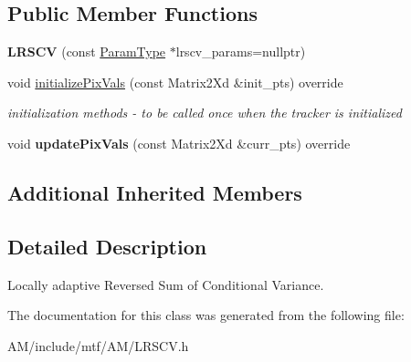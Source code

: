 \subsection*{Public Member Functions}
\begin{DoxyCompactItemize}
\item 
\hypertarget{classLRSCV_a8d86b6034bb0d83b09ae9a5c7b6ca465}{{\bfseries L\-R\-S\-C\-V} (const \hyperlink{structLRSCVParams}{Param\-Type} $\ast$lrscv\-\_\-params=nullptr)}\label{classLRSCV_a8d86b6034bb0d83b09ae9a5c7b6ca465}

\item 
\hypertarget{classLRSCV_a64ba22a930800736e44ce32ad802534c}{void \hyperlink{classLRSCV_a64ba22a930800736e44ce32ad802534c}{initialize\-Pix\-Vals} (const Matrix2\-Xd \&init\-\_\-pts) override}\label{classLRSCV_a64ba22a930800736e44ce32ad802534c}

\begin{DoxyCompactList}\small\item\em initialization methods -\/ to be called once when the tracker is initialized \end{DoxyCompactList}\item 
\hypertarget{classLRSCV_af7909caf4b17c62789b706d5d5dd23f7}{void {\bfseries update\-Pix\-Vals} (const Matrix2\-Xd \&curr\-\_\-pts) override}\label{classLRSCV_af7909caf4b17c62789b706d5d5dd23f7}

\end{DoxyCompactItemize}
\subsection*{Additional Inherited Members}


\subsection{Detailed Description}
Locally adaptive Reversed Sum of Conditional Variance. 

The documentation for this class was generated from the following file\-:\begin{DoxyCompactItemize}
\item 
A\-M/include/mtf/\-A\-M/L\-R\-S\-C\-V.\-h\end{DoxyCompactItemize}
